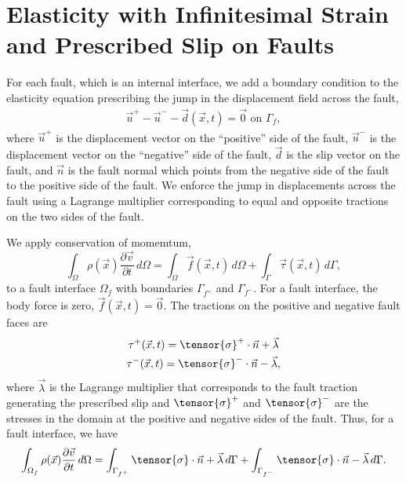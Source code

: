 \section{Elasticity with Infinitesimal Strain and Prescribed Slip on Faults}

For each fault, which is an internal interface, we add a boundary condition to the elasticity equation prescribing the jump in the displacement field across the fault,
\begin{gather}
  \label{eqn:bc:prescribed_slip}
  \vec{u}^+ - \vec{u}^- - \vec{d}(\vec{x},t) = \vec{0} \text{ on }\Gamma_f,
\end{gather}
where $\vec{u}^+$ is the displacement vector on the ``positive'' side of the fault, $\vec{u}^-$ is the displacement vector on the ``negative'' side of the fault, $\vec{d}$ is the slip vector on the fault, and $\vec{n}$ is the fault normal which points from the negative side of the fault to the positive side of the fault.
We enforce the jump in displacements across the fault using a Lagrange multiplier corresponding to equal and opposite tractions on the two sides of the fault.

We apply conservation of momemtum,
\begin{equation}
  \int_\Omega \rho(\vec{x}) \frac{\partial \vec{v}}{\partial t} \, d\Omega = \int_\Omega \vec{f}(\vec{x},t) \, d\Omega + \int_\Gamma \vec{\tau}(\vec{x},t) \, d\Gamma,
\end{equation}
to a fault interface $\Omega_f$ with boundaries $\Gamma_{f^+}$ and $\Gamma_{f^-}$.
For a fault interface, the body force is zero, $\vec{f}(\vec{x},t) = \vec{0}$.
The tractions on the positive and negative fault faces are
\begin{gather}
  \tau^+(\vec{x},t) = \tensor{\sigma}^+ \cdot \vec{n} + \vec{\lambda} \\
  \tau^-(\vec{x},t) = \tensor{\sigma}^- \cdot \vec{n} - \vec{\lambda},
\end{gather}
where $\vec{\lambda}$ is the Lagrange multiplier that corresponds to the fault traction generating the prescribed slip and $\tensor{\sigma}^+$ and $\tensor{\sigma}^-$ are the stresses in the domain at the positive and negative sides of the fault.
Thus, for a fault interface, we have
\begin{equation}
  \int_{\Omega_f} \rho(\vec{x}) \frac{\partial \vec{v}}{\partial t} \, d\Omega = \int_{\Gamma_{f^+}} \tensor{\sigma} \cdot \vec{n} + \vec{\lambda} \, d\Gamma + \int_{\Gamma_{f^-}} \tensor{\sigma} \cdot \vec{n} - \vec{\lambda} \, d\Gamma.
\end{equation}

